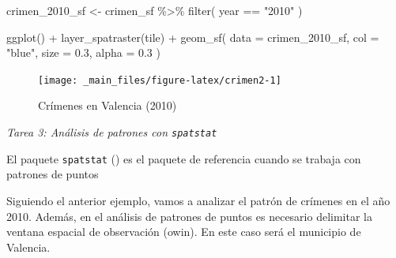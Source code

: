 \documentclass[
]{report}
\newenvironment{Shaded}{\begin{snugshade}}{\end{snugshade}}
\newcommand{\AttributeTok}[1]{\textcolor[rgb]{0.77,0.63,0.00}{#1}}
\newcommand{\FloatTok}[1]{\textcolor[rgb]{0.00,0.00,0.81}{#1}}
\newcommand{\FunctionTok}[1]{\textcolor[rgb]{0.00,0.00,0.00}{#1}}
\newcommand{\NormalTok}[1]{#1}
\newcommand{\OtherTok}[1]{\textcolor[rgb]{0.56,0.35,0.01}{#1}}
\newcommand{\SpecialCharTok}[1]{\textcolor[rgb]{0.00,0.00,0.00}{#1}}
\newcommand{\StringTok}[1]{\textcolor[rgb]{0.31,0.60,0.02}{#1}}
\theoremstyle{definition}
\theoremstyle{definition}
\theoremstyle{definition}
\theoremstyle{definition}
\theoremstyle{remark}
\begin{document}
\begin{Shaded}
\begin{Highlighting}[]
\NormalTok{crimen\_2010\_sf }\OtherTok{\textless{}{-}}\NormalTok{ crimen\_sf }\SpecialCharTok{\%\textgreater{}\%}
  \FunctionTok{filter}\NormalTok{(}
\NormalTok{    year }\SpecialCharTok{==} \StringTok{"2010"}
\NormalTok{  )}

\FunctionTok{ggplot}\NormalTok{() }\SpecialCharTok{+}
  \FunctionTok{layer\_spatraster}\NormalTok{(tile) }\SpecialCharTok{+}
  \FunctionTok{geom\_sf}\NormalTok{(}
    \AttributeTok{data =}\NormalTok{ crimen\_2010\_sf,}
    \AttributeTok{col =} \StringTok{"blue"}\NormalTok{,}
    \AttributeTok{size =} \FloatTok{0.3}\NormalTok{,}
    \AttributeTok{alpha =} \FloatTok{0.3}
\NormalTok{  )}
\end{Highlighting}
\end{Shaded}

\begin{figure}

{\centering \texttt{[image: \_main\_files/figure-latex/crimen2-1]} 

}

\caption{Crímenes en Valencia (2010)}\label{fig:crimen2}
\end{figure}

\emph{Tarea 3: Análisis de patrones con \texttt{spatstat}}

El paquete \texttt{spatstat} (\citet{spatstat_2005}) es el paquete de referencia cuando se
trabaja con patrones de puntos

Siguiendo el anterior ejemplo, vamos a analizar el patrón de crímenes en el año
2010. Además, en el análisis de patrones de puntos es necesario delimitar la
ventana espacial de observación (owin). En este caso será el municipio de
Valencia.
\end{document}
